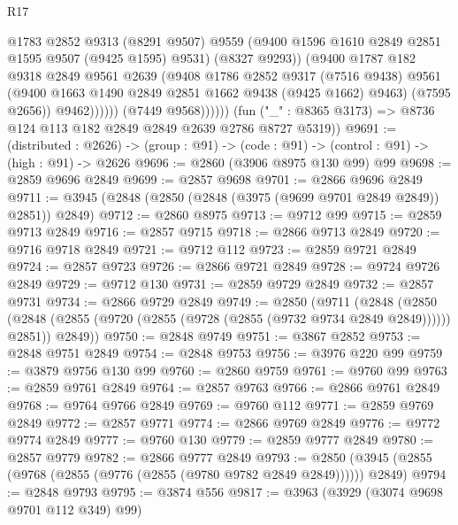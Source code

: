 \begin{lexlean}{R17}
\begin{coremodule}
                            @1783
                            @2852
                            @9313
                            (@8291 @9507)
                            @9559
                            (@9400 @1596 @1610 @2849 @2851 @1595 @9507 (@9425 @1595) @9531)
                            (@8327 @9293))
                          (@9400
                            @1787
                            @182
                            @9318
                            @2849
                            @9561
                            @2639
                            (@9408
                              @1786
                              @2852
                              @9317
                              (@7516 @9438)
                              @9561
                              (@9400 @1663 @1490 @2849 @2851 @1662 @9438 (@9425 @1662) @9463)
                              (@7595 @2656))
                            @9462))))))
                (@7449 @9568))))))
      (fun ("_" : @8365 @3173) => @8736 @124 @113 @182 @2849 @2849 @2639 @2786 @8727 @5319))
@9691 := (distributed : @2626) ->
  (group : @91) -> (code : @91) -> (control : @91) -> (high : @91) -> @2626
@9696 := @2860 (@3906 @8975 @130 @99) @99
@9698 := @2859 @9696 @2849
@9699 := @2857 @9698
@9701 := @2866 @9696 @2849
@9711 := @3945 (@2848 (@2850 (@2848 (@3975 (@9699 @9701 @2849 @2849)) @2851)) @2849)
@9712 := @2860 @8975
@9713 := @9712 @99
@9715 := @2859 @9713 @2849
@9716 := @2857 @9715
@9718 := @2866 @9713 @2849
@9720 := @9716 @9718 @2849
@9721 := @9712 @112
@9723 := @2859 @9721 @2849
@9724 := @2857 @9723
@9726 := @2866 @9721 @2849
@9728 := @9724 @9726 @2849
@9729 := @9712 @130
@9731 := @2859 @9729 @2849
@9732 := @2857 @9731
@9734 := @2866 @9729 @2849
@9749 := @2850
    (@9711
      (@2848
        (@2850 (@2848 (@2855 (@9720 (@2855 (@9728 (@2855 (@9732 @9734 @2849 @2849)))))) @2851))
        @2849))
@9750 := @2848 @9749
@9751 := @3867 @2852
@9753 := @2848 @9751 @2849
@9754 := @2848 @9753
@9756 := @3976 @220 @99
@9759 := @3879 @9756 @130 @99
@9760 := @2860 @9759
@9761 := @9760 @99
@9763 := @2859 @9761 @2849
@9764 := @2857 @9763
@9766 := @2866 @9761 @2849
@9768 := @9764 @9766 @2849
@9769 := @9760 @112
@9771 := @2859 @9769 @2849
@9772 := @2857 @9771
@9774 := @2866 @9769 @2849
@9776 := @9772 @9774 @2849
@9777 := @9760 @130
@9779 := @2859 @9777 @2849
@9780 := @2857 @9779
@9782 := @2866 @9777 @2849
@9793 := @2850 (@3945 (@2855 (@9768 (@2855 (@9776 (@2855 (@9780 @9782 @2849 @2849)))))) @2849)
@9794 := @2848 @9793
@9795 := @3874 @556
@9817 := @3963
    (@3929 (@3074 @9698 @9701 @112 @349) @99)

\end{coremodule}
\end{lexlean}
